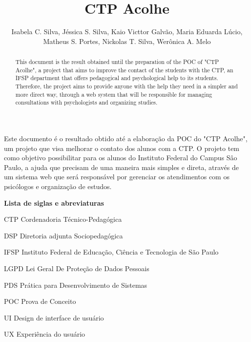 \documentclass[12pt,a4paper]{article}
\title{CTP Acolhe}
\author{Isabela C. Silva, Jéssica S. Silva, Kaio Victtor Galvão, Maria Eduarda Lúcio,\\ Matheus S. Portes, Nickolas T. Silva, Werônica A. Melo}
\begin{document}
 

\maketitle

\begin{abstract}
  This document is the result obtained until the preparation of the POC of "CTP Acolhe", a project that aims to improve the contact of the students with the CTP, an IFSP department that offers pedagogical and psychological help to its students. Therefore, the project aims to provide anyone with the help they need in a simpler and more direct way, through a web system that will be responsible for managing consultations with psychologists and organizing studies.

\end{abstract}
     
\begin{resumo} 
  Este documento é o resultado obtido até a elaboração da POC do "CTP Acolhe", um projeto que visa melhorar o contato dos alunos com a CTP. O projeto tem como objetivo possibilitar para os alunos do Instituto Federal do Campus Sâo Paulo, a ajuda que precisam de uma maneira mais simples e direta, através de um sistema web que será responsável por gerenciar os atendimentos com os psicólogos e organização de estudos.
\end{resumo}

\newpage

\listoffigures

\newpage
\begin{description}
        \item \textbf{Lista de siglas e abreviaturas}\\
        \item CTP Cordenadoria Técnico-Pedagógica
        \item DSP Diretoria adjunta Sociopedagógica
        \item IFSP Instituto Federal de Educação, Ciência e Tecnologia de São Paulo
        \item LGPD Lei Geral De Proteção de Dados Pessoais
        \item PDS Prática para Desenvolvimento de Sistemas
        \item POC Prova de Conceito
        \item UI Design de interface de usuário
        \item UX Experiência do usuário
        
\end{description}
\end{document}
